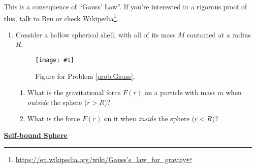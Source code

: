 \documentclass[11pt]{article}
\newcommand\plotoneman[2]{\centering \leavevmode
  \texttt{[image: \#1]}}
\renewcommand{\section}[1]{\textbf{\underline{#1}}}
\begin{document}
This is a consequence of ``Gauss' Law''. If you're interested in a
rigorous proof of this, talk to Ben or check Wikipedia\footnote{\href{https://en.wikipedia.org/wiki/Gauss's\_law\_for\_gravity}{https://en.wikipedia.org/wiki/Gauss's\_law\_for\_gravity}}.

\begin{enumerate}[resume]
\item
  \label{prob.Gauss}
  Consider a hollow spherical shell, with all of its mass $M$ contained
  at a radius $R$.
  
  \begin{figure*}[hbt]
    \plotoneman{shell}{0.4}
    \caption{Figure for Problem \ref{prob.Gauss}.}
  \end{figure*}

  \begin{enumerate}
  \item
    \label{prob.Gauss.1}
    What is the gravitational force $F(r)$ on a particle with mass $m$
    when \textit{outside} the sphere ($r > R$)?
  \item
    \label{prob.Gauss.2}
    What is the force $F(r)$ on it when \textit{inside} the sphere ($r
    < R$)?
  \end{enumerate}
\end{enumerate}

\section{Self-bound Sphere}
\end{document}
